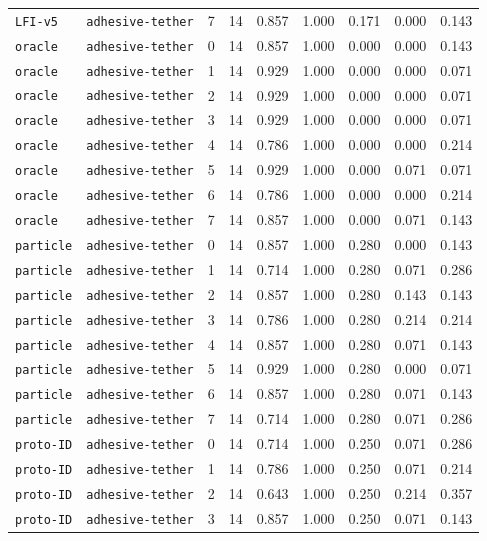 \documentclass{article}
\begin{document}
\begin{center}
{\begin{tabular}{llllccccc}
\texttt{LFI-v5} & \texttt{adhesive-tether} & 7 & 14 & 0.857 & 1.000 & 0.171 & 0.000 & 0.143 \\
\texttt{oracle} & \texttt{adhesive-tether} & 0 & 14 & 0.857 & 1.000 & 0.000 & 0.000 & 0.143 \\
\texttt{oracle} & \texttt{adhesive-tether} & 1 & 14 & 0.929 & 1.000 & 0.000 & 0.000 & 0.071 \\
\texttt{oracle} & \texttt{adhesive-tether} & 2 & 14 & 0.929 & 1.000 & 0.000 & 0.000 & 0.071 \\
\texttt{oracle} & \texttt{adhesive-tether} & 3 & 14 & 0.929 & 1.000 & 0.000 & 0.000 & 0.071 \\
\texttt{oracle} & \texttt{adhesive-tether} & 4 & 14 & 0.786 & 1.000 & 0.000 & 0.000 & 0.214 \\
\texttt{oracle} & \texttt{adhesive-tether} & 5 & 14 & 0.929 & 1.000 & 0.000 & 0.071 & 0.071 \\
\texttt{oracle} & \texttt{adhesive-tether} & 6 & 14 & 0.786 & 1.000 & 0.000 & 0.000 & 0.214 \\
\texttt{oracle} & \texttt{adhesive-tether} & 7 & 14 & 0.857 & 1.000 & 0.000 & 0.071 & 0.143 \\
\texttt{particle} & \texttt{adhesive-tether} & 0 & 14 & 0.857 & 1.000 & 0.280 & 0.000 & 0.143 \\
\texttt{particle} & \texttt{adhesive-tether} & 1 & 14 & 0.714 & 1.000 & 0.280 & 0.071 & 0.286 \\
\texttt{particle} & \texttt{adhesive-tether} & 2 & 14 & 0.857 & 1.000 & 0.280 & 0.143 & 0.143 \\
\texttt{particle} & \texttt{adhesive-tether} & 3 & 14 & 0.786 & 1.000 & 0.280 & 0.214 & 0.214 \\
\texttt{particle} & \texttt{adhesive-tether} & 4 & 14 & 0.857 & 1.000 & 0.280 & 0.071 & 0.143 \\
\texttt{particle} & \texttt{adhesive-tether} & 5 & 14 & 0.929 & 1.000 & 0.280 & 0.000 & 0.071 \\
\texttt{particle} & \texttt{adhesive-tether} & 6 & 14 & 0.857 & 1.000 & 0.280 & 0.071 & 0.143 \\
\texttt{particle} & \texttt{adhesive-tether} & 7 & 14 & 0.714 & 1.000 & 0.280 & 0.071 & 0.286 \\
\texttt{proto-ID} & \texttt{adhesive-tether} & 0 & 14 & 0.714 & 1.000 & 0.250 & 0.071 & 0.286 \\
\texttt{proto-ID} & \texttt{adhesive-tether} & 1 & 14 & 0.786 & 1.000 & 0.250 & 0.071 & 0.214 \\
\texttt{proto-ID} & \texttt{adhesive-tether} & 2 & 14 & 0.643 & 1.000 & 0.250 & 0.214 & 0.357 \\
\texttt{proto-ID} & \texttt{adhesive-tether} & 3 & 14 & 0.857 & 1.000 & 0.250 & 0.071 & 0.143 \\
\bottomrule
\end{tabular}%
}
\end{center}
\end{document}
